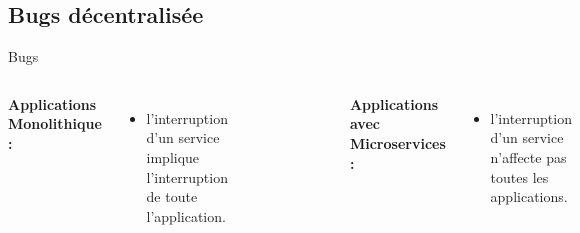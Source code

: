 \documentclass{beamer}
\begin{document}
\subsection{Bugs d\'ecentralis\'ee}
\begin{frame}{Bugs}
    \begin{columns}
        \textbf{Applications Monolithique :} 
                \begin{itemize}
                    \item l'interruption d'un service implique l'interruption de toute l'application.
                \end{itemize}
        \begin{figure}
            \begin{center}
            \includegraphics[width=0.8\textwidth]{BUGmono.png}
            \end{center}
        \end{figure}
        \pause
        \textbf{Applications avec Microservices :}
         \begin{itemize}
                    \item l'interruption d'un service n'affecte pas toutes les applications.
                \end{itemize}
        \begin{figure}
            \begin{center}
            \includegraphics[width=0.8\textwidth]{BUGMicroservices.png}
            \end{center}
        \end{figure}
        


\end{columns}
\end{frame}
\end{document}
